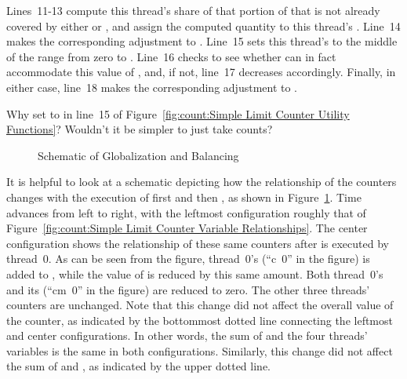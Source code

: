 Lines~11-13 compute this thread's share of that portion of
 that is not already covered by either
 or , and assign the
computed quantity to this thread's .
Line~14 makes the corresponding adjustment to .
Line~15 sets this thread's  to the middle of the range
from zero to .
Line~16 checks to see whether  can in fact accommodate
this value of , and, if not, line~17 decreases 
accordingly.
Finally, in either case, line~18 makes the corresponding adjustment to
.

\QuickQuiz{}
	Why set  to  in line~15 of
	Figure~\ref{fig:count:Simple Limit Counter Utility Functions}?
	Wouldn't it be simpler to just take  counts?
 \QuickQuizEnd

\begin{figure}[tb]
\begin{center}
\end{center}
\caption{Schematic of Globalization and Balancing}
\label{fig:count:Schematic of Globalization and Balancing}
\end{figure}

It is helpful to look at a schematic depicting how the relationship
of the counters changes with the execution of first
 and then , as shown in
Figure~\ref{fig:count:Schematic of Globalization and Balancing}.
Time advances from left to right, with the leftmost configuration
roughly that of
Figure~\ref{fig:count:Simple Limit Counter Variable Relationships}.
The center configuration shows the relationship of these same counters
after  is executed by thread~0.
As can be seen from the figure, thread~0's  (``c~0'' in
the figure) is added to , while the value of
 is reduced by this same amount.
Both thread~0's  and its 
(``cm~0'' in the figure) are reduced to zero.
The other three threads' counters are unchanged.
Note that this change did not affect the overall value of the counter,
as indicated by the bottommost dotted line connecting the leftmost
and center configurations.
In other words, the sum of  and the four threads'
 variables is the same in both configurations.
Similarly, this change did not affect the sum of  and
, as indicated by the upper dotted line.

